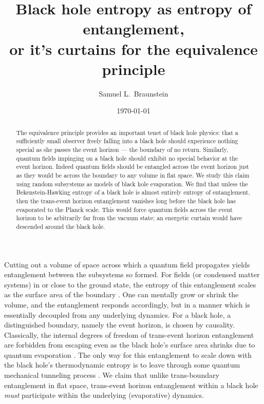 \documentclass[twocolumn,aps,prl]{revtex4}
\begin{document}
\title{Black hole entropy as entropy of entanglement,\\
or it's curtains for the equivalence principle}

\author{Samuel L.\ Braunstein}

\date{\today}

\begin{abstract}
The equivalence principle provides an important tenet of black hole
physics: that a sufficiently small observer freely falling into a
black hole should experience nothing special as she passes the event
horizon --- the boundary of no return. Similarly, quantum fields
impinging on a black hole should exhibit no special behavior at the
event horizon. Indeed quantum fields should be entangled across the
event horizon just as they would be across the boundary to any volume
in flat space. We study this claim using random subsystems as models
of black hole evaporation. We find that unless the Bekenstein-Hawking
entropy of a black hole is almost entirely entropy of entanglement,
then the trans-event horizon entanglement vanishes long before the
black hole has evaporated to the Planck scale. This would force quantum
fields across the event horizon to be arbitrarily far from the vacuum
state; an energetic curtain would have descended around the black hole.
\end{abstract}

\maketitle

Cutting out a volume of space across which a quantum field propagates
yields entanglement between the subsystems so formed. For fields (or
condensed matter systems) in or close to the ground state, the
entropy of this entanglement scales as the surface area of the
boundary \cite{Eisert09}. One can mentally grow or shrink the volume,
and the entanglement responds accordingly, but in a manner which is
essentially decoupled from any underlying dynamics. For a black hole,
a distinguished boundary, namely the event horizon, is chosen by
causality. Classically, the internal degrees of freedom of trans-event
horizon entanglement are forbidden from escaping even as the black
hole's surface area shrinks due to quantum evaporation \cite{Hawking75}.
The only way for this entanglement to scale down with the black hole's
thermodynamic entropy is to leave through some quantum mechanical
tunneling process \cite{Parikh00}. We claim that unlike trans-boundary
entanglement in flat space, trans-event horizon entanglement within a
black hole {\it must\/} participate within the underlying (evaporative)
dynamics. 
\end{document}
